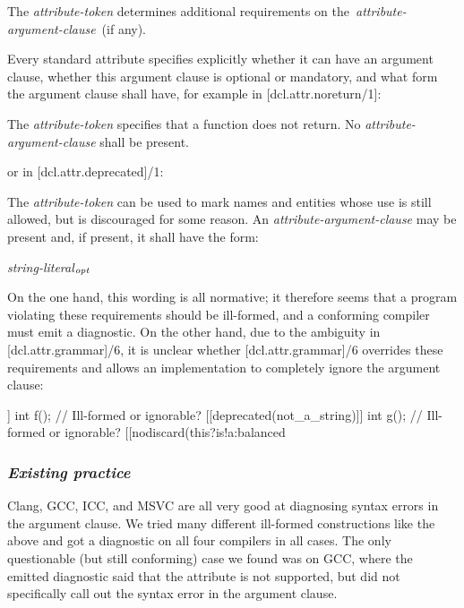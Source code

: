 \begin{adjustwidth}{0.5cm}{0.5cm}
[...] The \emph{attribute-token} determines additional requirements on the \emph{attribute-argument-clause} (if any).
\end{adjustwidth}

Every standard attribute specifies explicitly whether it can have an argument clause, whether this argument clause is optional or mandatory, and what form the argument clause shall have, for example in [dcl.attr.noreturn/1]:

\begin{adjustwidth}{0.5cm}{0.5cm}
The \emph{attribute-token}  specifies that a function does not return. No \emph{attribute-argument-clause} shall be present.
\end{adjustwidth}

or in [dcl.attr.deprecated]/1:

\begin{adjustwidth}{0.5cm}{0.5cm}
The \emph{attribute-token}  can be used to mark names and entities whose use is still allowed, but is discouraged for some reason. An \emph{attribute-argument-clause} may be present and, if present, it shall have the form:

\tcode{( }\emph{string-literal}$_\emph{opt}$\tcode{ )}
\end{adjustwidth}

On the one hand, this wording is all normative; it therefore seems that a program violating these requirements should be ill-formed, and a conforming compiler must emit a diagnostic. On the other hand, due to the ambiguity in [dcl.attr.grammar]/6, it is unclear whether [dcl.attr.grammar]/6 overrides these requirements and allows an implementation to completely ignore the argument clause:

\begin{codeblock}
[[noreturn("cannot have a reason")]] int f();                 // Ill-formed or ignorable?
[[deprecated(not_a_string)]] int g();                         // Ill-formed or ignorable?
[[nodiscard(this?is!a:balanced%
\end{codeblock}

\subsubsection*{\emph{Existing practice}}

Clang, GCC, ICC, and MSVC are all very good at diagnosing syntax errors in the argument clause. We tried many different ill-formed constructions like the above and got a diagnostic on all four compilers in all cases. The only questionable (but still conforming) case we found was  on GCC, where the emitted diagnostic said that the  attribute is not supported, but did not specifically call out the syntax error in the argument clause.

